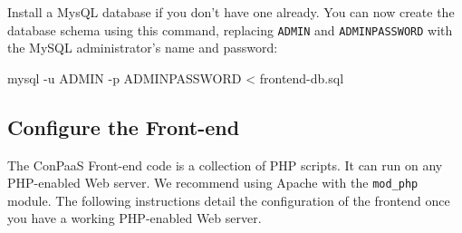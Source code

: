 \documentclass[10pt]{article}
\begin{document}
Install a MysQL database if you don't have one already. You can now
create the database schema using this command, replacing \verb+ADMIN+
and \verb+ADMINPASSWORD+ with the MySQL administrator's name and
password:

\begin{code}
  mysql -u ADMIN -p ADMINPASSWORD  < frontend-db.sql
\end{code}


\subsection{Configure the Front-end}

The ConPaaS Front-end code is a collection of PHP scripts. It can run
on any PHP-enabled Web server. We recommend using Apache with the
\verb+mod_php+ module. The following instructions detail the
configuration of the frontend once you have a working PHP-enabled Web
server.
\end{document}
